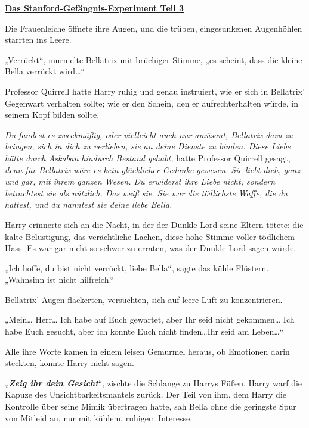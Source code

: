 

\hypertarget{das-stanford-gefuxe4ngnis-experiment-teil-3}{%

\textbf{\uline{Das Stanford-Gefängnis-Experiment Teil 3}}

Die Frauenleiche öffnete ihre Augen, und die trüben, eingesunkenen Augenhöhlen starrten ins Leere.

„Verrückt“, murmelte Bellatrix mit brüchiger Stimme, „es scheint, dass die kleine Bella verrückt wird…“

Professor Quirrell hatte Harry ruhig und genau instruiert, wie er sich in Bellatrix' Gegenwart verhalten sollte; wie er den Schein, den er aufrechterhalten würde, in seinem Kopf bilden sollte.

\emph{Du fandest es zweckmäßig, oder vielleicht auch nur amüsant, Bellatrix dazu zu bringen, sich in dich zu verlieben, sie an deine Dienste zu binden. Diese Liebe hätte durch Askaban hindurch Bestand gehabt,} hatte Professor Quirrell gesagt, \emph{denn für Bellatrix wäre es kein glücklicher Gedanke gewesen. Sie liebt dich, ganz und gar, mit ihrem ganzen Wesen. Du erwiderst ihre Liebe nicht, sondern betrachtest sie als nützlich. Das weiß sie. Sie war die tödlichste Waffe, die du hattest, und du nanntest sie deine liebe Bella.}

Harry erinnerte sich an die Nacht, in der der Dunkle Lord seine Eltern tötete: die kalte Belustigung, das verächtliche Lachen, diese hohe Stimme voller tödlichem Hass. Es war gar nicht so schwer zu erraten, was der Dunkle Lord sagen würde.

„Ich hoffe, du bist nicht verrückt, liebe Bella“, sagte das kühle Flüstern. „Wahnsinn ist nicht hilfreich.“

Bellatrix' Augen flackerten, versuchten, sich auf leere Luft zu konzentrieren.

„Mein… Herr… Ich habe auf Euch gewartet, aber Ihr seid nicht gekommen… Ich habe Euch gesucht, aber ich konnte Euch nicht finden…Ihr seid am Leben…“

Alle ihre Worte kamen in einem leisen Gemurmel heraus, ob Emotionen darin steckten, konnte Harry nicht sagen.

„\textbf{\emph{Zeig ihr dein Gesicht}}“, zischte die Schlange zu Harrys Füßen. Harry warf die Kapuze des Unsichtbarkeitsmantels zurück. Der Teil von ihm, dem Harry die Kontrolle über seine Mimik übertragen hatte, sah Bella ohne die geringste Spur von Mitleid an, nur mit kühlem, ruhigem Interesse.

}
